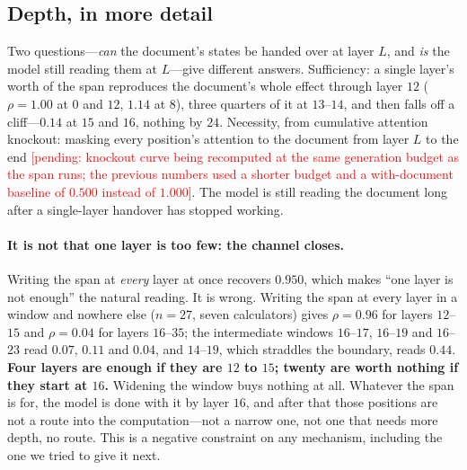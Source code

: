 \documentclass{article}
\newcommand{\PEND}[1]{\textcolor{red}{[pending: #1]}}
\begin{document}
\subsection{Depth, in more detail}
\label{app:depth2}

Two questions---\emph{can} the document's states be handed over at layer $L$,
and \emph{is} the model still reading them at $L$---give different answers.
Sufficiency: a single layer's worth of the span reproduces the document's whole
effect through layer $12$ ($\rho = 1.00$ at $0$ and $12$, $1.14$ at $8$), three
quarters of it at $13$--$14$, and then falls off a cliff---$0.14$ at $15$ and
$16$, nothing by $24$. Necessity, from cumulative attention knockout: masking
every position's attention to the document from layer $L$ to the end
\PEND{knockout curve being recomputed at the same generation budget as the span
runs; the previous numbers used a shorter budget and a with-document baseline of
$0.500$ instead of $1.000$}. The model is still reading the document long after
a single-layer handover has stopped working.

\paragraph{It is not that one layer is too few: the channel closes.} Writing the
span at \emph{every} layer at once recovers $0.950$, which makes ``one layer is
not enough'' the natural reading. It is wrong. Writing the span at every layer
in a window and nowhere else ($n=27$, seven calculators) gives $\rho = 0.96$ for
layers $12$--$15$ and $\rho = 0.04$ for layers $16$--$35$; the intermediate
windows $16$--$17$, $16$--$19$ and $16$--$23$ read $0.07$, $0.11$ and $0.04$,
and $14$--$19$, which straddles the boundary, reads $0.44$. \textbf{Four layers
are enough if they are $12$ to $15$; twenty are worth nothing if they start at
$16$.} Widening the window buys nothing at all. Whatever the span is for, the
model is done with it by layer $16$, and after that those positions are not a
route into the computation---not a narrow one, not one that needs more depth, no
route. This is a negative constraint on any mechanism, including the one we
tried to give it next.
\end{document}
